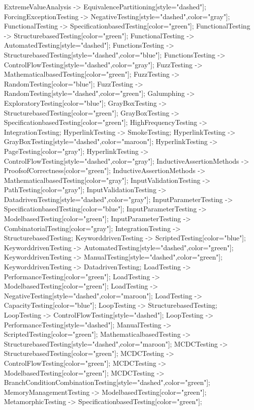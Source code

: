 \documentclass{article}
\begin{document}
{ExtremeValueAnalysis -> EquivalencePartitioning[style="dashed"];
ForcingExceptionTesting -> NegativeTesting[style="dashed",color="gray"];
FunctionalTesting -> SpecificationbasedTesting[color="green"];
FunctionalTesting -> StructurebasedTesting[color="green"];
FunctionalTesting -> AutomatedTesting[style="dashed"];
FunctionsTesting -> StructurebasedTesting[style="dashed",color="blue"];
FunctionsTesting -> ControlFlowTesting[style="dashed",color="gray"];
FuzzTesting -> MathematicalbasedTesting[color="green"];
FuzzTesting -> RandomTesting[color="blue"];
FuzzTesting -> RandomTesting[style="dashed",color="green"];
Galumphing -> ExploratoryTesting[color="blue"];
GrayBoxTesting -> StructurebasedTesting[color="green"];
GrayBoxTesting -> SpecificationbasedTesting[color="green"];
HighFrequencyTesting -> IntegrationTesting;
HyperlinkTesting -> SmokeTesting;
HyperlinkTesting -> GrayBoxTesting[style="dashed",color="maroon"];
HyperlinkTesting -> PageTesting[color="gray"];
HyperlinkTesting -> ControlFlowTesting[style="dashed",color="gray"];
InductiveAssertionMethods -> ProofsofCorrectness[color="green"];
InductiveAssertionMethods -> MathematicalbasedTesting[color="gray"];
InputValidationTesting -> PathTesting[color="gray"];
InputValidationTesting -> DatadrivenTesting[style="dashed",color="gray"];
InputParameterTesting -> SpecificationbasedTesting[color="blue"];
InputParameterTesting -> ModelbasedTesting[color="green"];
InputParameterTesting -> CombinatorialTesting[color="gray"];
IntegrationTesting -> StructurebasedTesting;
KeyworddrivenTesting -> ScriptedTesting[color="blue"];
KeyworddrivenTesting -> AutomatedTesting[style="dashed",color="green"];
KeyworddrivenTesting -> ManualTesting[style="dashed",color="green"];
KeyworddrivenTesting -> DatadrivenTesting;
LoadTesting -> PerformanceTesting[color="green"];
LoadTesting -> ModelbasedTesting[color="green"];
LoadTesting -> NegativeTesting[style="dashed",color="maroon"];
LoadTesting -> CapacityTesting[color="blue"];
LoopTesting -> StructurebasedTesting;
LoopTesting -> ControlFlowTesting[style="dashed"];
LoopTesting -> PerformanceTesting[style="dashed"];
ManualTesting -> ScriptedTesting[color="green"];
MathematicalbasedTesting -> StructurebasedTesting[style="dashed",color="maroon"];
MCDCTesting -> StructurebasedTesting[color="green"];
MCDCTesting -> ControlFlowTesting[color="green"];
MCDCTesting -> ModelbasedTesting[color="green"];
MCDCTesting -> BranchConditionCombinationTesting[style="dashed",color="green"];
MemoryManagementTesting -> ModelbasedTesting[color="green"];
MetamorphicTesting -> SpecificationbasedTesting[color="green"];
}
\end{document}
